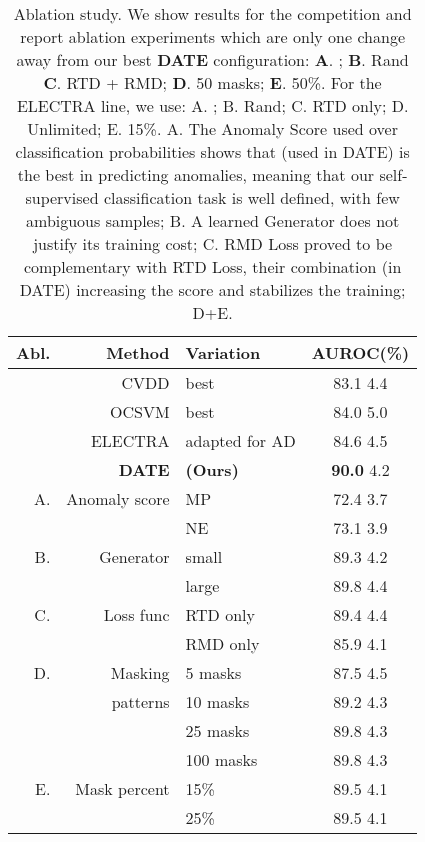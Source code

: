 \documentclass[11pt]{article}
\begin{document}
\setlength{\tabcolsep}{3pt}
\begin{table}[t!]
\begin{center}
	\begin{tabular}{r r l c}
		\toprule
		\multicolumn{1}{p{0.1cm}}{Abl.} &
        \multicolumn{1}{p{1.5cm}}{\raggedright \;\;\;\;\;\;\;\;\;\;\;Method} &
        \multicolumn{1}{p{0.5cm}}{\raggedleft Variation} &
        \multicolumn{1}{p{0.9cm}}{\centering AUROC(\%)} \\
        \midrule
        & CVDD  & best & 83.1  \small 4.4 \\
        
        & OCSVM & best & 84.0  \small 5.0 \\ 
        
        & ELECTRA & adapted for AD & 84.6   \small 4.5\\ 

        & \textbf{DATE} & \textbf{(Ours)} & \textbf{90.0}  \small 4.2 \\ 
\midrule
        \midrule
        A. & Anomaly score  & MP &  72.4  \small  3.7\\
        &         		    & NE &  73.1  \small  3.9\\
		\midrule
		B. &  Generator   & small & 89.3   \small 4.2 \\ 
		&                 & large   & 89.8   \small 4.4 \\
		\midrule
		C. & Loss func    & RTD only & 89.4  \small 4.4 \\
		&                 & RMD only & 85.9  \small 4.1 \\
        \midrule
		D. & Masking       & 5 masks  &  87.5  \small 4.5 \\
        & patterns         & 10 masks &  89.2  \small 4.3 \\
        &                  & 25 masks &  89.8  \small 4.3 \\
	    &                   & 100 masks & 89.8  \small 4.3 \\ \midrule
        E. & Mask percent   & 15\% & 89.5  \small 4.1 \\ &                   & 25\% & 89.5  \small 4.1 \\ \bottomrule
    \end{tabular}
\end{center}
\caption{Ablation study. We show results for the competition and report ablation experiments which are only one change away from our best \textbf{DATE} configuration: \textbf{A}. ; \textbf{B}. Rand \textbf{C}. RTD + RMD; \textbf{D}. 50 masks; \textbf{E}. 50\%. For the ELECTRA line, we use: A. ; B. Rand; C. RTD only; D. Unlimited; E. 15\%.
A. The Anomaly Score used over classification probabilities shows that  (used in DATE) is the best in predicting anomalies, meaning that our self-supervised classification task is well defined, with few ambiguous samples; B. A learned Generator does not justify its training cost; C. RMD Loss proved to be complementary with RTD Loss, their combination (in DATE) increasing the score and stabilizes the training; D+E.}
\label{tab: ablation}
\end{table}
\end{document}
